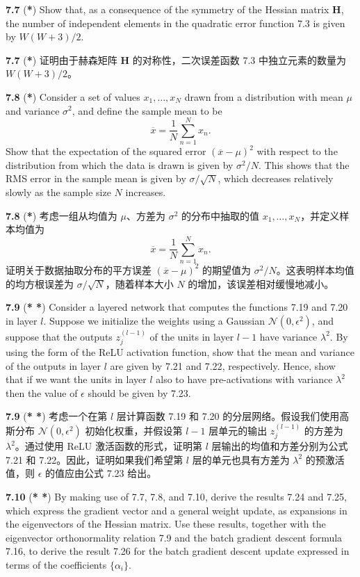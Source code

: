 \documentclass{article}
\begin{document}
\textbf{7.7} (\textbf{*}) Show that, as a consequence of the symmetry of the Hessian matrix $\mathbf{H}$, the number of independent elements in the quadratic error function {7.3} is given by $W(W+3)/2$.

\textbf{7.7} (\textbf{*}) 证明由于赫森矩阵 $\mathbf{H}$ 的对称性，二次误差函数 {7.3} 中独立元素的数量为 $W(W+3)/2$。

\textbf{7.8} (\textbf{*}) Consider a set of values $x_1, \ldots, x_N$ drawn from a distribution with mean $\mu$ and variance $\sigma^2$, and define the sample mean to be
\[
\overline{x} = \frac{1}{N} \sum_{n=1}^{N} x_n.
\]
Show that the expectation of the squared error $(\overline{x} - \mu)^2$ with respect to the distribution from which the data is drawn is given by $\sigma^2/N$. This shows that the RMS error in the sample mean is given by $\sigma/\sqrt{N}$, which decreases relatively slowly as the sample size $N$ increases.

\textbf{7.8} (\textbf{*}) 考虑一组从均值为 $\mu$、方差为 $\sigma^2$ 的分布中抽取的值 $x_1, \ldots, x_N$，并定义样本均值为
\[
\overline{x} = \frac{1}{N} \sum_{n=1}^{N} x_n.
\]
证明关于数据抽取分布的平方误差 $(\overline{x} - \mu)^2$ 的期望值为 $\sigma^2/N$。这表明样本均值的均方根误差为 $\sigma/\sqrt{N}$，随着样本大小 $N$ 的增加，该误差相对缓慢地减小。

\textbf{7.9} (\textbf{* *}) Consider a layered network that computes the functions {7.19} and {7.20} in layer $l$. Suppose we initialize the weights using a Gaussian $\mathcal{N}(0, \epsilon^2)$, and suppose that the outputs $z_j^{(l-1)}$ of the units in layer $l-1$ have variance $\lambda^2$. By using the form of the ReLU activation function, show that the mean and variance of the outputs in layer $l$ are given by {7.21} and {7.22}, respectively. Hence, show that if we want the units in layer $l$ also to have pre-activations with variance $\lambda^2$ then the value of $\epsilon$ should be given by {7.23}.

\textbf{7.9} (\textbf{* *}) 考虑一个在第 $l$ 层计算函数 {7.19} 和 {7.20} 的分层网络。假设我们使用高斯分布 $\mathcal{N}(0, \epsilon^2)$ 初始化权重，并假设第 $l-1$ 层单元的输出 $z_j^{(l-1)}$ 的方差为 $\lambda^2$。通过使用 ReLU 激活函数的形式，证明第 $l$ 层输出的均值和方差分别为公式 {7.21} 和 {7.22}。因此，证明如果我们希望第 $l$ 层的单元也具有方差为 $\lambda^2$ 的预激活值，则 $\epsilon$ 的值应由公式 {7.23} 给出。

\textbf{7.10} (\textbf{* *}) By making use of {7.7}, {7.8}, and {7.10}, derive the results {7.24} and {7.25}, which express the gradient vector and a general weight update, as expansions in the eigenvectors of the Hessian matrix. Use these results, together with the eigenvector orthonormality relation {7.9} and the batch gradient descent formula {7.16}, to derive the result {7.26} for the batch gradient descent update expressed in terms of the coefficients $\{\alpha_i\}$.
\end{document}
